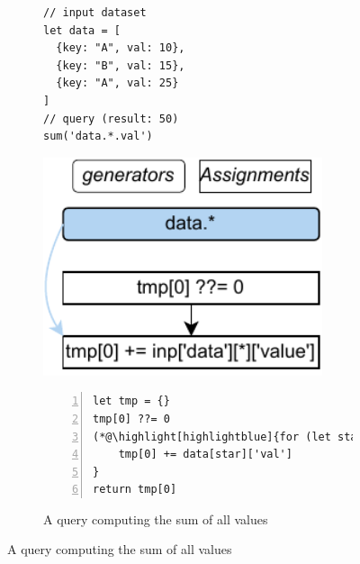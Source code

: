 \documentclass[runningheads]{llncs}
\begin{document}
\begin{figure}[t!]
\begin{subfigure}{\textwidth}
\begin{minipage}{0.25\textwidth}
\begin{lstlisting}[style=JavaScript, columns=flexible]
// input dataset
let data = [
  {key: "A", val: 10},
  {key: "B", val: 15},
  {key: "A", val: 25}
]
// query (result: 50)
sum('data.*.val')
\end{lstlisting}
\end{minipage}
\begin{minipage}{0.21\textwidth}
\centering
\includegraphics[width=0.9\textwidth]{images/intro_q1_ir.pdf}
\end{minipage}
\begin{minipage}{0.54\textwidth}
\begin{lstlisting}[style=JavaScript, columns=flexible, numbers=left, xleftmargin=2pt]
let tmp = {}
tmp[0] ??= 0
(*@\highlight[highlightblue]{for (let star in data) }@*) {
    tmp[0] += data[star]['val']
}
return tmp[0]
\end{lstlisting}
\end{minipage}
\caption{A query computing the sum of all values}\label{fig:intro_q1}
\end{subfigure}


\end{figure}
\end{document}
